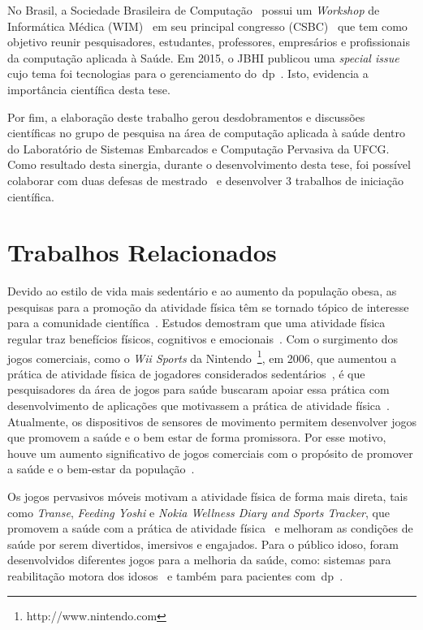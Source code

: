 No Brasil, a Sociedade Brasileira de Computação~\cite{sbc2016} possui um \textit{Workshop} de Informática Médica (WIM)~\cite{wim2016} em seu principal congresso (CSBC)~\cite{csbc2016} que tem como objetivo reunir pesquisadores, estudantes, professores, empresários e profissionais da computação aplicada à Saúde. Em 2015, o JBHI publicou uma \textit{special issue} cujo tema foi tecnologias para o gerenciamento do~\ac{dp}~\cite{specjbhi2015}. Isto, evidencia a importância científica desta tese. %

Por fim, a elaboração deste trabalho gerou desdobramentos e discussões científicas no grupo de pesquisa na área de computação aplicada à saúde dentro do Laboratório de Sistemas Embarcados e Computação Pervasiva da UFCG. Como resultado desta sinergia, durante o desenvolvimento desta tese, foi possível colaborar com duas defesas de mestrado~\cite{antonio2013,gustavo2014} e desenvolver 3 trabalhos de iniciação científica. 


\section{Trabalhos Relacionados}\label{section:trabalhos_relacionados}
Devido ao estilo de vida mais sedentário e ao aumento da população obesa, as pesquisas para a promoção da atividade física têm se tornado tópico de interesse para a comunidade científica~\cite{maitland2009,bartolome11,Mandryk2014}. Estudos demostram que uma atividade física regular traz benefícios físicos, cognitivos e emocionais~\cite{Mandryk2014}. Com o surgimento dos jogos comerciais, como o \textit{Wii Sports} da Nintendo~\footnote{http://www.nintendo.com}, em 2006, que aumentou a prática de atividade física de jogadores considerados sedentários~\cite{wiigraves2008}, é que pesquisadores da área de jogos para saúde buscaram apoiar essa prática com desenvolvimento de aplicações que motivassem a prática de atividade física~\cite{stacey2011}. Atualmente, os dispositivos de sensores de movimento permitem desenvolver jogos que promovem a saúde e o bem estar de forma promissora. Por esse motivo, houve um aumento significativo de jogos comerciais com o propósito de promover a saúde e o bem-estar da população~\cite{Papastergiou:2009:EPC:1570538.1570707}.


Os jogos pervasivos móveis motivam a atividade física de forma mais direta, tais como \textit{Transe}, \textit{Feeding Yoshi} e  \textit{Nokia Wellness Diary and Sports Tracker}, que promovem a saúde com a prática de atividade física~\cite{Suhonen:2008:SFE:1457199.1457204} e melhoram as condições de saúde por serem divertidos, imersivos e engajados. Para o público idoso, foram desenvolvidos diferentes jogos para a melhoria da saúde, como: sistemas para reabilitação motora dos idosos~\cite{brox11} e também para pacientes com~\ac{dp}~\cite{atkinson2010,synnott_wiipd_2012,sacbespoke2014}. 

